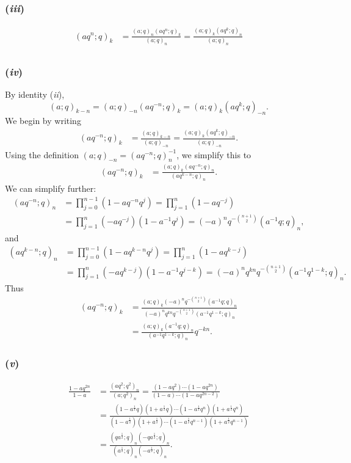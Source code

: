 \subsubsection*{(\textit{iii})}\label{subsubsec:1.1(iii)}
\begin{align*}
    (aq^n;q)_k &= \frac{(a;q)_n(aq^n;q)_k}{(a;q)_n} = \frac{(a;q)_k(aq^k;q)_n}{(a;q)_n} \\[0.5em]
\end{align*}

\subsubsection*{(\textit{iv})}\label{subsubsec:1.1(iv)}
By identity (\textit{ii}),
\[
    (a;q)_{k-n}=(a;q)_{-n}(aq^{-n};q)_k = (a;q)_k(aq^k;q)_{-n}.
\]
We begin by writing
\begin{align*}
    (aq^{-n};q)_k &= \frac{(a;q)_{k-n}}{(a;q)_{-n}}
    = \frac{(a;q)_k(aq^k;q)_{-n}}{(a;q)_{-n}}.
\end{align*}
Using the definition $(a;q)_{-n}=(aq^{-n};q)_n^{-1}$, we simplify this to
\begin{align*}
    (aq^{-n};q)_k &= \frac{(a;q)_k(aq^{-n};q)_n}{(aq^{k-n};q)_n}.
\end{align*}
We can simplify further:
\begin{align*}
    (aq^{-n};q)_n &= \prod_{j=0}^{n-1}(1-aq^{-n}q^j) = \prod_{j=1}^{n}(1-aq^{-j}) \\
    &= \prod_{j=1}^{n}(-aq^{-j})(1-a^{-1}q^{j})
    = (-a)^n q^{-\binom{n+1}{2}}(a^{-1}q;q)_n,
\end{align*}
and
\begin{align*}
    (aq^{k-n};q)_n &= \prod_{j=0}^{n-1}(1-aq^{k-n}q^j) = \prod_{j=1}^{n}(1-aq^{k-j})\\
    &= \prod_{j=1}^{n}(-aq^{k-j})(1-a^{-1}q^{j-k})
    = (-a)^n q^{kn} q^{-\binom{n+1}{2}} (a^{-1} q^{1-k};q)_n.
\end{align*}
Thus
\begin{align*}
    (aq^{-n};q)_k &= \frac{(a;q)_k(-a)^n q^{-\binom{n+1}{2}}(a^{-1}q;q)_n}{(-a)^n q^{kn} q^{-\binom{n+1}{2}} (a^{-1} q^{1-k};q)_n}\\[0.5em]
    &= \frac{(a;q)_k (a^{-1}q;q)_n}{(a^{-1} q^{1-k};q)_n}q^{-kn}.
\end{align*}

\subsubsection*{(\textit{v})}\label{subsubsec:1.1(v)}
\begin{align*}
    \frac{1-aq^{2n}}{1-a} &= \frac{(aq^2;q^2)_n}{(a;q^2)_n}
    = \frac{(1-aq^2)\cdots(1-aq^{2n})}{(1-a)\cdots(1-aq^{2n-2})} \\[0.5em]
    &= \frac{(1-a^{\frac{1}{2}}q)(1+a^{\frac{1}{2}}q)\cdots(1-a^{\frac{1}{2}}q^{n})(1+a^{\frac{1}{2}}q^{n})}{(1-a^{\frac{1}{2}})(1+a^{\frac{1}{2}})\cdots(1-a^{\frac{1}{2}}q^{n-1})(1+a^{\frac{1}{2}}q^{n-1})}\\[0.5em]
    &= \frac{(qa^{\frac{1}{2}};q)_n (-qa^{\frac{1}{2}};q)_n}{(a^{\frac{1}{2}};q)_n(-a^{\frac{1}{2}};q)_n}.
\end{align*}


